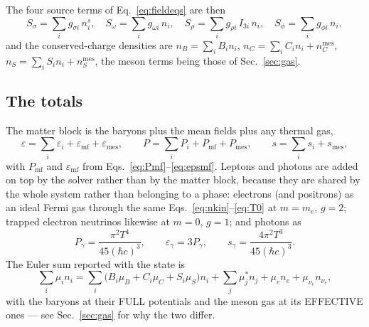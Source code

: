 \documentclass[aps,prc,onecolumn,superscriptaddress,nofootinbib,10pt]{revtex4-2}
\newcommand{\nB}{n_B}
\newcommand{\muB}{\mu_B}
\newcommand{\muC}{\mu_C}
\newcommand{\muS}{\mu_S}
\newcommand{\munue}{\mu_{\nu_e}}
\begin{document}
The four source terms of Eq.~\eqref{eq:fieldeqs} are then
%
\begin{equation}
S_\sigma = \sum_i g_{\sigma i}\, n^s_i, \quad
S_\omega = \sum_i g_{\omega i}\, n_i, \quad
S_\rho = \sum_i g_{\rho i}\, I_{3i}\, n_i, \quad
S_\phi = \sum_i g_{\phi i}\, n_i ,
\label{eq:sources}
\end{equation}
%
and the conserved-charge densities are
$\nB = \sum_i B_i n_i$, $n_C = \sum_i C_i n_i + n_C^{\mathrm{mes}}$,
$n_S = \sum_i S_i n_i + n_S^{\mathrm{mes}}$, the meson terms being those of
Sec.~\ref{sec:gas}.

\subsection{The totals}
\label{sec:totals}

The matter block is the baryons plus the mean fields plus any thermal gas,
%
\begin{equation}
\varepsilon = \sum_i \varepsilon_i + \varepsilon_{\mathrm{mf}}
              + \varepsilon_{\mathrm{mes}},
\qquad
P = \sum_i P_i + P_{\mathrm{mf}} + P_{\mathrm{mes}},
\qquad
s = \sum_i s_i + s_{\mathrm{mes}} ,
\label{eq:matter}
\end{equation}
%
with $P_{\mathrm{mf}}$ and $\varepsilon_{\mathrm{mf}}$ from
Eqs.~\eqref{eq:Pmf}--\eqref{eq:epsmf}. Leptons and photons are added on top by
the solver rather than by the matter block, because they are shared by the
whole system rather than belonging to a phase: electrons (and positrons) as an
ideal Fermi gas through the same Eqs.~\eqref{eq:nkin}--\eqref{eq:T0} at
$m = m_e$, $g = 2$; trapped electron neutrinos likewise at $m = 0$, $g = 1$;
and photons as
%
\begin{equation}
P_\gamma = \frac{\pi^2 T^4}{45 (\hbar c)^3}, \qquad
\varepsilon_\gamma = 3 P_\gamma, \qquad
s_\gamma = \frac{4\pi^2 T^3}{45 (\hbar c)^3} .
\label{eq:photons}
\end{equation}
%
The Euler sum reported with the state is
%
\begin{equation}
\sum_i \mu_i n_i
  = \sum_i \big( B_i \muB + C_i \muC + S_i \muS \big) n_i
  + \sum_j \mu^{*}_j n_j
  + \mu_e n_e + \munue n_{\nu_e} ,
\label{eq:eulersum}
\end{equation}
%
with the baryons at their FULL potentials and the meson gas at its EFFECTIVE
ones --- see Sec.~\ref{sec:gas} for why the two differ.
\end{document}
